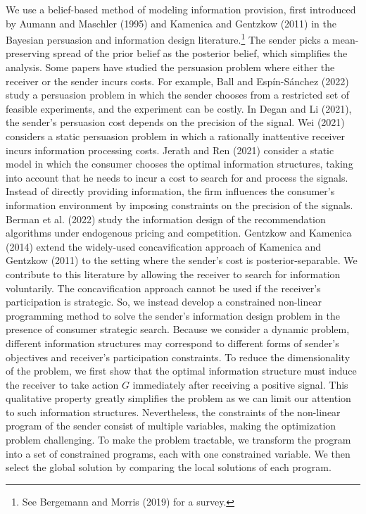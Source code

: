 \documentclass[11pt]{extarticle}
\begin{document}
We use a belief-based method of modeling information provision, first introduced by Aumann and Maschler (1995) and Kamenica and Gentzkow (2011) in the Bayesian persuasion and information design literature.\footnote{See Bergemann and Morris (2019) for a survey.} The sender picks a mean-preserving spread of the prior belief as the posterior belief, which simplifies the analysis. Some papers have studied the persuasion problem where either the receiver or the sender incurs costs. For example, Ball and Espín-Sánchez (2022) study a persuasion problem in which the sender chooses from a restricted set of feasible experiments, and the experiment can be costly. In Degan and Li (2021), the sender's persuasion cost depends on the precision of the signal. Wei (2021) considers a static persuasion problem in which a rationally inattentive receiver incurs information processing costs. Jerath and Ren (2021) consider a static model in which the consumer chooses the optimal information structures, taking into account that he needs to incur a cost to search for and process the signals. Instead of directly providing information, the firm influences the consumer's information environment by imposing constraints on the precision of the signals. Berman et al. (2022) study the information design of the recommendation algorithms under endogenous pricing and competition. Gentzkow and Kamenica (2014) extend the widely-used concavification approach of Kamenica and Gentzkow (2011) to the setting where the sender's cost is posterior-separable. We contribute to this literature by allowing the receiver to search for information voluntarily. The concavification approach cannot be used if the receiver's participation is strategic. So, we instead develop a constrained non-linear programming method to solve the sender's information design problem in the presence of consumer strategic search. Because we consider a dynamic problem, different information structures may correspond to different forms of sender's objectives and receiver's participation constraints. To reduce the dimensionality of the problem, we first show that the optimal information structure must induce the receiver to take action $G$ immediately after receiving a positive signal. This qualitative property greatly simplifies the problem as we can limit our attention to such information structures. Nevertheless, the constraints of the non-linear program of the sender consist of multiple variables, making the optimization problem challenging. To make the problem tractable, we transform the program into a set of constrained programs, each with one constrained variable. We then select the global solution by comparing the local solutions of each program.
\end{document}
